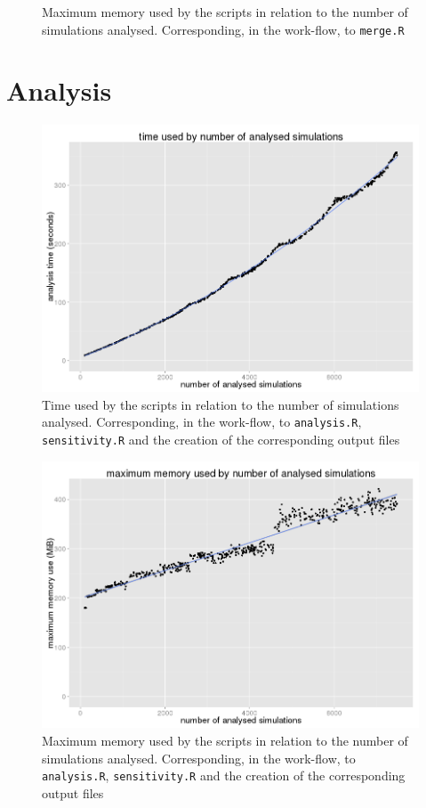 \documentclass[a4paper,12pt]{report}
\begin{document}
\begin{figure}[ht]
	\centering
	\caption{Maximum memory used by the scripts in relation to the number of simulations analysed. Corresponding, in the work-flow, to \texttt{merge.R}}
	\label{app:bench-merging-mem}
\end{figure}


\section{Analysis}
\begin{figure}[ht]
	\centering
	\includegraphics[scale=0.39]{../data/analysis-timeByNSimulations.png}
	\caption{Time used by the scripts in relation to the number of simulations analysed. Corresponding, in the work-flow, to \texttt{analysis.R}, \texttt{sensitivity.R} and the creation of the corresponding output files}
	\label{app:bench-analysis-time}
\end{figure}

\begin{figure}[ht]
	\centering
	\includegraphics[scale=0.39]{../data/analysis-maxMemByNSimulations.png}
	\caption{Maximum memory used by the scripts in relation to the number of simulations analysed. Corresponding, in the work-flow, to \texttt{analysis.R}, \texttt{sensitivity.R} and the creation of the corresponding output files}
	\label{app:bench-analysis-mem}
\end{figure}

\end{document}

